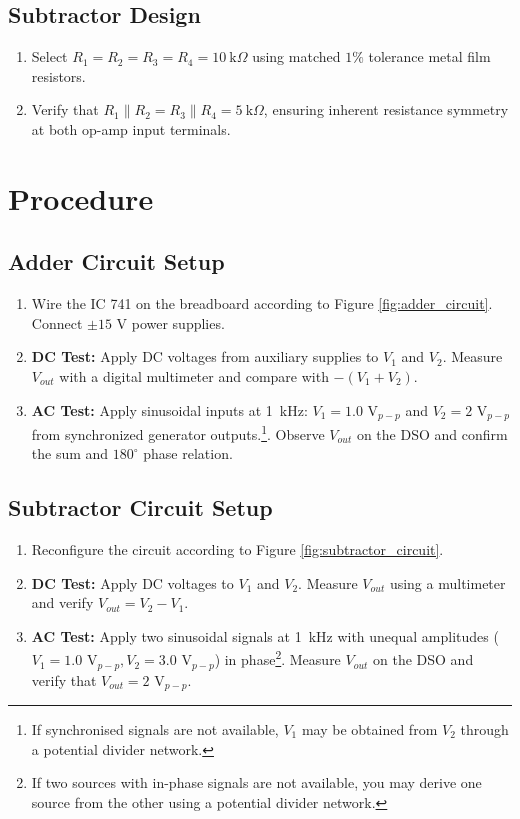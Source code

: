 \subsection{Subtractor Design}
\begin{enumerate}
	\item Select $R_1 = R_2 = R_3 = R_4 = \SI{10}{\kilo\Omega}$ using matched $1\%$ tolerance metal film resistors.
	\item Verify that $R_1 \parallel R_2 = R_3 \parallel R_4 = \SI{5}{\kilo\Omega}$, ensuring inherent resistance symmetry at both op-amp input terminals.
\end{enumerate}

\section{Procedure}
\subsection{Adder Circuit Setup}
\begin{enumerate}
	\item Wire the IC 741 on the breadboard according to Figure \ref{fig:adder_circuit}. Connect $\pm 15\text{ V}$ power supplies.
	\item \textbf{DC Test:} Apply DC voltages from auxiliary supplies to $V_1$ and $V_2$. Measure $V_{out}$ with a digital multimeter and compare with $-(V_1 + V_2)$.
	\item \textbf{AC Test:} Apply sinusoidal inputs at \SI{1}{\kilo\hertz}: $V_1 = 1.0\text{ V}_{p-p}$ and $V_2 = 2\text{ V}_{p-p}$ from synchronized generator outputs.\footnote{If synchronised signals are not available, $V_1$ may be obtained from $V_2$ through a potential divider network.}. Observe $V_{out}$ on the DSO and confirm the sum and $180^\circ$ phase relation.
\end{enumerate}

\subsection{Subtractor Circuit Setup}
\begin{enumerate}
	\item Reconfigure the circuit according to Figure \ref{fig:subtractor_circuit}.
	\item \textbf{DC Test:} Apply DC voltages to $V_1$ and $V_2$. Measure $V_{out}$ using a multimeter and verify $V_{out} = V_2 - V_1$.
	\item \textbf{AC Test:} Apply two sinusoidal signals at \SI{1}{\kilo\hertz} with unequal amplitudes ($V_1 = 1.0\text{ V}_{p-p}, V_2 = 3.0\text{ V}_{p-p}$) in phase\footnote{If two sources with in-phase signals are not available, you may derive one source from the other using a potential divider network.}. Measure $V_{out}$ on the DSO and verify that $V_{out} = 2\text{ V}_{p-p}$.
\end{enumerate}

